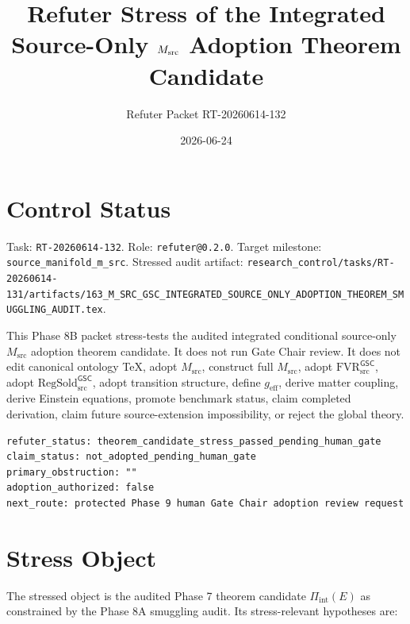 \documentclass[11pt]{article}
\title{Refuter Stress of the Integrated Source-Only \(\Msrc\) Adoption Theorem Candidate}
\author{Refuter Packet RT-20260614-132}
\date{2026-06-24}
\newcommand{\Msrc}{M_{\mathrm{src}}}
\newcommand{\RegSold}{\mathrm{RegSold}_{\mathrm{src}}^{\mathsf{GSC}}}
\newcommand{\FVR}{\mathrm{FVR}_{\mathrm{src}}^{\mathsf{GSC}}}
\begin{document}
\maketitle

\section{Control Status}

Task: \texttt{RT-20260614-132}. Role:
\texttt{refuter@0.2.0}. Target milestone:
\texttt{source\_manifold\_m\_src}. Stressed audit artifact:
\texttt{research\_control/tasks/RT-20260614-131/artifacts/163\_M\_SRC\_GSC\_INTEGRATED\_SOURCE\_ONLY\_ADOPTION\_THEOREM\_SMUGGLING\_AUDIT.tex}.

This Phase 8B packet stress-tests the audited integrated conditional
source-only \(\Msrc\) adoption theorem candidate. It does not run Gate Chair
review. It does not edit canonical ontology TeX, adopt \(\Msrc\), construct
full \(\Msrc\), adopt \(\FVR\), adopt \(\RegSold\), adopt transition
structure, define \(g_{\mathrm{eff}}\), derive matter coupling, derive
Einstein equations, promote benchmark status, claim completed derivation, claim
future source-extension impossibility, or reject the global theory.

\begin{verbatim}
refuter_status: theorem_candidate_stress_passed_pending_human_gate
claim_status: not_adopted_pending_human_gate
primary_obstruction: ""
adoption_authorized: false
next_route: protected Phase 9 human Gate Chair adoption review request
\end{verbatim}

\section{Stress Object}

The stressed object is the audited Phase 7 theorem candidate
\(\Pi_{\mathrm{int}}(E)\) as constrained by the Phase 8A smuggling audit. Its
stress-relevant hypotheses are:
\end{document}
